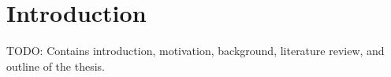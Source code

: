 \chapter{Introduction}\label{chap:introduction}
TODO: Contains introduction, motivation, background, literature review, and outline of the thesis.